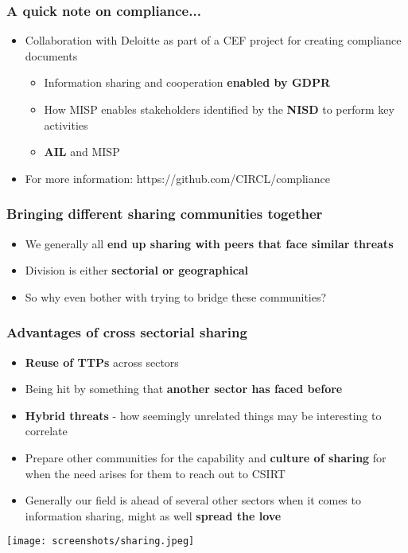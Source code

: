 \begin{frame}
\frametitle{A quick note on compliance...}
\begin{itemize}
	\item Collaboration with Deloitte as part of a CEF project for creating compliance documents
	\begin{itemize}
		\item Information sharing and cooperation {\bf enabled by GDPR}
		\item How MISP enables stakeholders identified by the {\bf NISD} to perform key activities
		\item {\bf AIL} and MISP
	\end{itemize}
	\item For more information: https://github.com/CIRCL/compliance
\end{itemize}
\end{frame}

\begin{frame}
\frametitle{Bringing different sharing communities together}
\begin{itemize}
	\item We generally all {\bf end up sharing with peers that face similar threats}
	\item Division is either {\bf sectorial or geographical}
	\item So why even bother with trying to bridge these communities?
\end{itemize}
\end{frame}

\begin{frame}
\frametitle{Advantages of cross sectorial sharing}
\begin{itemize}
	\item {\bf Reuse of TTPs} across sectors
	\item Being hit by something that {\bf another sector has faced before}
	\item {\bf Hybrid threats} - how seemingly unrelated things may be interesting to correlate
	\item Prepare other communities for the capability and {\bf culture of sharing} for when the need arises for them to reach out to CSIRT
	\item Generally our field is ahead of several other sectors when it comes to information sharing, might as well {\bf spread the love}
\end{itemize}
\texttt{[image: screenshots/sharing.jpeg]}
\end{frame}

